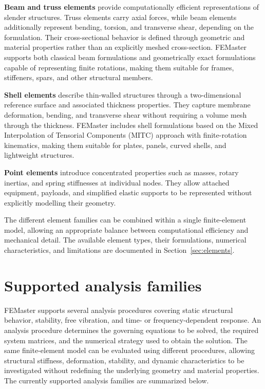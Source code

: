 \textbf{Beam and truss elements} provide computationally efficient representations of slender structures. Truss elements carry axial forces, while beam elements additionally represent bending, torsion, and transverse shear, depending on the formulation. Their cross-sectional behavior is defined through geometric and material properties rather than an explicitly meshed cross-section. FEMaster supports both classical beam formulations and geometrically exact formulations capable of representing finite rotations, making them suitable for frames, stiffeners, spars, and other structural members.

\textbf{Shell elements} describe thin-walled structures through a two-dimensional reference surface and associated thickness properties. They capture membrane deformation, bending, and transverse shear without requiring a volume mesh through the thickness. FEMaster includes shell formulations based on the Mixed Interpolation of Tensorial Components (MITC) approach with finite-rotation kinematics, making them suitable for plates, panels, curved shells, and lightweight structures.

\textbf{Point elements} introduce concentrated properties such as masses, rotary inertias, and spring stiffnesses at individual nodes. They allow attached equipment, payloads, and simplified elastic supports to be represented without explicitly modelling their geometry.

The different element families can be combined within a single finite-element model, allowing an appropriate balance between computational efficiency and mechanical detail. The available element types, their formulations, numerical characteristics, and limitations are documented in Section~\ref{sec:elements}.


\section{Supported analysis families}

FEMaster supports several analysis procedures covering static structural behavior, stability, free vibration, and time- or frequency-dependent response. An analysis procedure determines the governing equations to be solved, the required system matrices, and the numerical strategy used to obtain the solution. The same finite-element model can be evaluated using different procedures, allowing structural stiffness, deformation, stability, and dynamic characteristics to be investigated without redefining the underlying geometry and material properties. The currently supported analysis families are summarized below.

